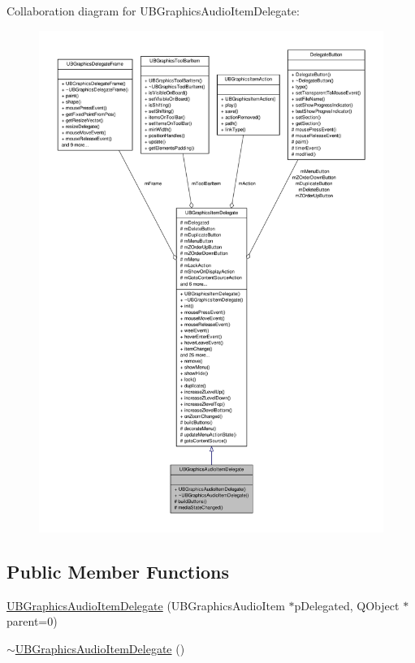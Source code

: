 Collaboration diagram for U\-B\-Graphics\-Audio\-Item\-Delegate\-:
\nopagebreak
\begin{figure}[H]
\begin{center}
\leavevmode
\includegraphics[width=350pt]{d5/d4b/class_u_b_graphics_audio_item_delegate__coll__graph}
\end{center}
\end{figure}
\subsection*{Public Member Functions}
\begin{DoxyCompactItemize}
\item 
\hyperlink{class_u_b_graphics_audio_item_delegate_a455ae7785757946c69026483db9f420f}{U\-B\-Graphics\-Audio\-Item\-Delegate} (U\-B\-Graphics\-Audio\-Item $\ast$p\-Delegated, Q\-Object $\ast$parent=0)
\item 
\hyperlink{class_u_b_graphics_audio_item_delegate_a465d148fadc1ca75f83111f958a067b4}{$\sim$\-U\-B\-Graphics\-Audio\-Item\-Delegate} ()
\end{DoxyCompactItemize}

